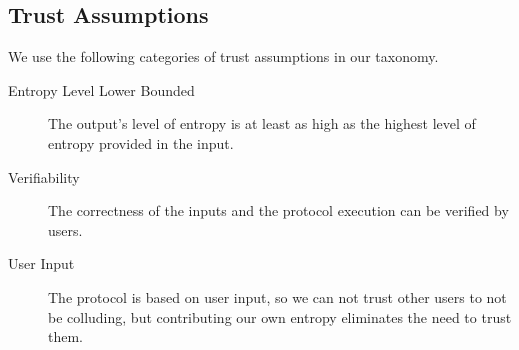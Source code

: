 \subsection{Trust Assumptions}
\label{sub:trust_assumptions}
We use the following categories of trust assumptions in our taxonomy. 
\begin{description}
    \item [Entropy Level Lower Bounded] The output's level of entropy is at least as high as the highest level of entropy provided in the input.
    \item [Verifiability] The correctness of the inputs and the protocol execution can be verified by users. 
    \item [User Input] The protocol is based on user input, so we can not trust other users to not be colluding, but contributing our own entropy eliminates the need to trust them.
\end{description}
